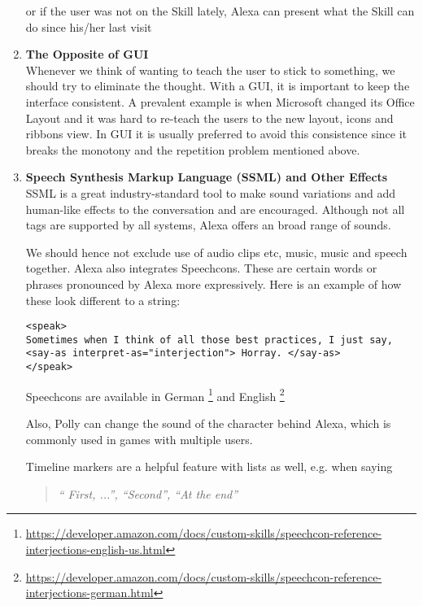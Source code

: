 \begin{enumerate}
or if the user was not on the Skill lately, Alexa can present what the Skill can do since his/her last visit





\item \textbf{The Opposite of GUI}\\
Whenever we think of wanting to teach the user to stick to something, we should try to eliminate the thought. With a GUI, it is important to keep the interface consistent. A prevalent example is when Microsoft changed its Office Layout and it was hard to re-teach the users to the new layout, icons and ribbons view. In GUI it is usually preferred to avoid this consistence since it breaks the monotony and the repetition problem mentioned above.

\item \textbf{Speech Synthesis Markup Language (SSML) and Other Effects}\\
SSML is a great industry-standard tool to make sound variations and add human-like effects to the conversation and are encouraged. Although not all tags are supported by all systems, Alexa offers an broad range of sounds.

We should hence not exclude use of audio clips etc, music, music and speech together. Alexa also integrates Speechcons. These are certain words or phrases pronounced by Alexa more expressively. Here is an example of how these look different to a string:

\begin{verbatim}
<speak>
Sometimes when I think of all those best practices, I just say,
<say-as interpret-as="interjection"> Horray. </say-as> 
</speak>
\end{verbatim}

Speechcons are available in German \footnote{\url{https://developer.amazon.com/docs/custom-skills/speechcon-reference-interjections-english-us.html}} and English \footnote{\url{https://developer.amazon.com/docs/custom-skills/speechcon-reference-interjections-german.html}}

Also, Polly can change the sound of the character behind Alexa, which is commonly used in games with multiple users.

Timeline markers are a helpful feature with lists as well, e.g. when saying 

\begin{quotation}
	\flushright
	\textit{	`` First, ...'', ``Second'', ``At the end''}
\end{quotation}





\end{enumerate}
